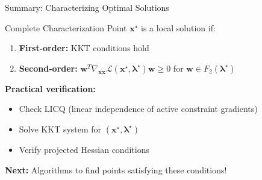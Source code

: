 \documentclass[aspectratio=1610]{beamer}
\begin{document}
\begin{frame}{Summary: Characterizing Optimal Solutions}
  \begin{block}{Complete Characterization}
    Point $\mathbf{x}^{\star}$ is a local solution if:
    \begin{enumerate}
      \item \textbf{First-order:} KKT conditions hold
      \item \textbf{Second-order:} $\mathbf{w}^T \nabla_{\mathbf{x}\mathbf{x}} \mathcal{L}(\mathbf{x}^{\star}, \boldsymbol{\lambda}^{\star}) \mathbf{w} \geq 0$ for $\mathbf{w} \in F_2(\boldsymbol{\lambda}^{\star})$
    \end{enumerate}
  \end{block}

  
  \textbf{Practical verification:}
  \begin{itemize}
    \item Check LICQ (linear independence of active constraint gradients)
    \item Solve KKT system for $(\mathbf{x}^{\star}, \boldsymbol{\lambda}^{\star})$
    \item Verify projected Hessian conditions
  \end{itemize}
  
  \vspace{0.3cm}
  \textbf{Next:} Algorithms to find points satisfying these conditions!
\end{frame}
\end{document}

